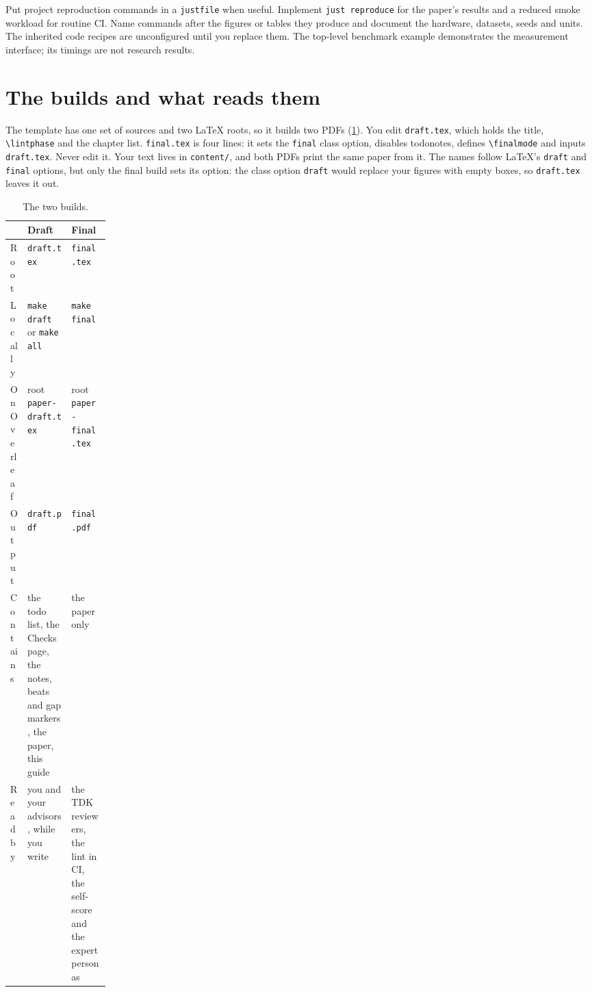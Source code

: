 Put project reproduction commands in a \texttt{justfile} when useful. Implement \texttt{just reproduce} for the paper's results and a reduced smoke workload for routine CI. Name commands after the figures or tables they produce and document the hardware, datasets, seeds and units. The inherited code recipes are unconfigured until you replace them. The top-level benchmark example demonstrates the measurement interface; its timings are not research results.

\section{The builds and what reads them}\label{guide:code:builds}
The template has one set of sources and two \LaTeX{} roots, so it builds two PDFs (\cref{guide:tab:code:builds}). You edit \texttt{draft.tex}, which holds the title, \texttt{\textbackslash lintphase} and the chapter list. \texttt{final.tex} is four lines: it sets the \texttt{final} class option, disables todonotes, defines \texttt{\textbackslash finalmode} and inputs \texttt{draft.tex}. Never edit it. Your text lives in \texttt{content/}, and both PDFs print the same paper from it. The names follow \LaTeX{}'s \texttt{draft} and \texttt{final} options, but only the final build sets its option: the class option \texttt{draft} would replace your figures with empty boxes, so \texttt{draft.tex} leaves it out.
\begin{table}[!ht]
  \centering
  \small
  \caption{The two builds.}
  \label{guide:tab:code:builds}
  \begin{tabularx}{\linewidth}{>{\raggedright\arraybackslash}p{0.17\linewidth} >{\raggedright\arraybackslash}X >{\raggedright\arraybackslash}X}
    \toprule
     & \textbf{Draft} & \textbf{Final} \\
    \midrule
    Root & \texttt{draft.tex} & \texttt{final.tex} \\
    Locally & \texttt{make draft} or \texttt{make all} & \texttt{make final} \\
    On Overleaf & root \texttt{paper-draft.tex} & root \texttt{paper-final.tex} \\
    Output & \texttt{draft.pdf} & \texttt{final.pdf} \\
    Contains & the todo list, the Checks page, the notes, beats and gap markers, the paper, this guide & the paper only \\
    Read by & you and your advisors, while you write & the TDK reviewers, the lint in CI, the self-score and the expert personas \\
    \bottomrule
  \end{tabularx}
\end{table}


